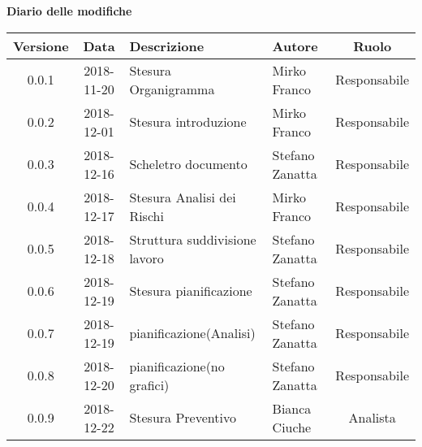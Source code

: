 	\begin{center}
		\textbf{Diario delle modifiche}
	\end{center}
	\begin{center}
		\begin{tabularx}{\textwidth}{|c|c|X|X|c|}
			\hline
			\textbf{Versione} & \textbf{Data} & \textbf{Descrizione} & \textbf{Autore} & \textbf{Ruolo} \\
			\hline
			0.0.1 & 2018-11-20 & Stesura Organigramma & Mirko Franco & Responsabile\\
			\hline
			0.0.2 & 2018-12-01 & Stesura introduzione & Mirko Franco & Responsabile\\
			\hline
			0.0.3 & 2018-12-16 & Scheletro documento &Stefano Zanatta & Responsabile\\
			\hline
			0.0.4 & 2018-12-17 & Stesura Analisi dei Rischi & Mirko Franco & Responsabile\\
			\hline
			0.0.5 & 2018-12-18 & Struttura suddivisione lavoro & Stefano Zanatta & Responsabile\\
			\hline
			0.0.6 & 2018-12-19 & Stesura pianificazione & Stefano Zanatta & Responsabile\\
			\hline
			0.0.7 & 2018-12-19 & pianificazione(Analisi) & Stefano Zanatta & Responsabile\\
			\hline
			0.0.8 & 2018-12-20 & pianificazione(no grafici) & Stefano Zanatta & Responsabile\\
			\hline
			0.0.9 & 2018-12-22 & Stesura Preventivo & Bianca Ciuche & Analista\\
			\hline
			
		\end{tabularx}
	\end{center}
\newpage